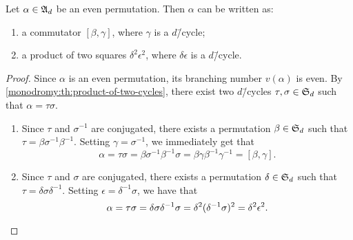 \begin{corollary}\label{monodromy:th:even-permutation-commutator-or-squares}
Let $\alpha\in\altgroup[d]$ be an even permutation. Then $\alpha$ can be written as:
\begin{enumerate}
\item a commutator $[\beta,\gamma]$, where $\gamma$ is a $d$\=/cycle;
\item a product of two squares $\delta^2\epsilon^2$, where $\delta\epsilon$ is a $d$\=/cycle.
\end{enumerate}
\end{corollary}
\begin{proof}
Since $\alpha$ is an even permutation, its branching number $v(\alpha)$ is even. By \cref{monodromy:th:product-of-two-cycles}, there exist two $d$\=/cycles $\tau,\sigma\in\symgroup[d]$ such that $\alpha=\tau\sigma$.
\begin{enumerate}
\item Since $\tau$ and $\sigma^{-1}$ are conjugated, there exists a permutation $\beta\in\symgroup[d]$ such that $\tau=\beta\sigma^{-1}\beta^{-1}$. Setting $\gamma=\sigma^{-1}$, we immediately get that
\[
\alpha=\tau\sigma=\beta\sigma^{-1}\beta^{-1}\sigma=\beta\gamma\beta^{-1}\gamma^{-1}=[\beta,\gamma].
\]
\item Since $\tau$ and $\sigma$ are conjugated, there exists a permutation $\delta\in\symgroup[d]$ such that $\tau=\delta\sigma\delta^{-1}$. Setting $\epsilon=\delta^{-1}\sigma$, we have that
\[
\alpha=\tau\sigma=\delta\sigma\delta^{-1}\sigma=\delta^2(\delta^{-1}\sigma)^2=\delta^2\epsilon^2.\qedhere
\]
\end{enumerate}
\end{proof}


